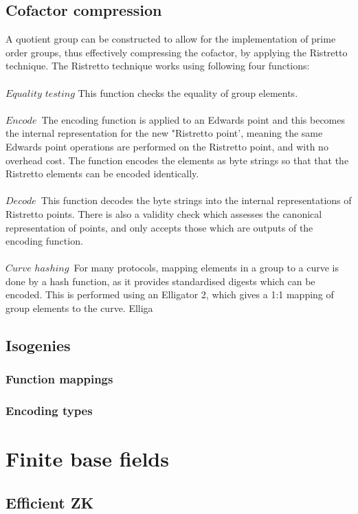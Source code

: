\documentclass{article}
\begin{document}
\subsection{Cofactor compression}
A quotient group can be constructed to allow for the implementation of prime order groups, thus effectively compressing the cofactor, by applying the Ristretto technique. The Ristretto technique works using following four functions:\\\\   
${Equality}$ ${testing}$ This function checks the equality of group elements. \\\\
${Encode}$\ The encoding function is applied to an Edwards point and this becomes the internal representation for the new "Ristretto point', meaning the same Edwards point operations are performed on the Ristretto point, and with no overhead cost. The function encodes the elements as byte strings so that that the Ristretto elements can be encoded identically.\\\\
${Decode}$\ This function decodes the byte strings into the internal representations of Ristretto points. There is also a validity check which assesses the canonical representation of points, and only accepts those which are outputs of the encoding function. \\\\
${Curve}$ ${hashing}$\ For many protocols, mapping elements in a group to a curve is done by a hash function, as it provides standardised digests which can be encoded. This is performed using an Elligator 2, which gives a 1:1 mapping of group elements to the curve. Elliga
 
\subsection{Isogenies}
\subsubsection {Function mappings}
\subsubsection{Encoding types}

\section{Finite base fields}
\subsection{Efficient ZK}
\end{document}
